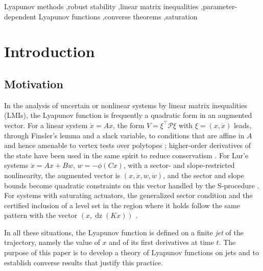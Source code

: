 \documentclass[preprint,12pt,authoryear]{elsarticle}
\theoremstyle{definition}
\theoremstyle{remark}
\newcommand{\tr}{^{\top}}
\newcommand{\PP}{\mathcal{P}}
\newcommand{\dz}{\operatorname{dz}}
\begin{document}
\begin{frontmatter}
\begin{keyword}
Lyapunov methods \sep robust stability \sep linear matrix inequalities \sep parameter-dependent Lyapunov functions \sep converse theorems \sep saturation
\end{keyword}
\end{frontmatter}

\section{Introduction}

\subsection{Motivation}
In the analysis of uncertain or nonlinear systems by linear matrix inequalities (LMIs), the Lyapunov function is frequently a quadratic form in an augmented vector. For a linear system $\dot x=Ax$, the form $V=\xi\tr\PP\xi$ with $\xi=(x,\dot x)$ leads, through Finsler's lemma and a slack variable, to conditions that are affine in $A$ and hence amenable to vertex tests over polytopes \citep{OliveiraSkelton2001,EbiharaBook2015}; higher-order derivatives of the state have been used in the same spirit to reduce conservatism \citep{Ebihara2005}. For Lur'e systems $\dot x=Ax+Bw$, $w=-\phi(Cx)$, with a sector- and slope-restricted nonlinearity, the augmented vector is $(x,\dot x,w,\dot w)$, and the sector and slope bounds become quadratic constraints on this vector handled by the S-procedure \citep{Park2002,Drummond2018}. For systems with saturating actuators, the generalized sector condition and the certified inclusion of a level set in the region where it holds follow the same pattern with the vector $(x,\dz(Kx))$ \citep{GomesdaSilva2005,TarbouriechPrieur2006,TarbouriechBook2011}.

In all these situations, the Lyapunov function is defined on a finite \emph{jet} of the trajectory, namely the value of $x$ and of its first derivatives at time $t$. The purpose of this paper is to develop a theory of Lyapunov functions on jets and to establish converse results that justify this practice.
\end{document}
